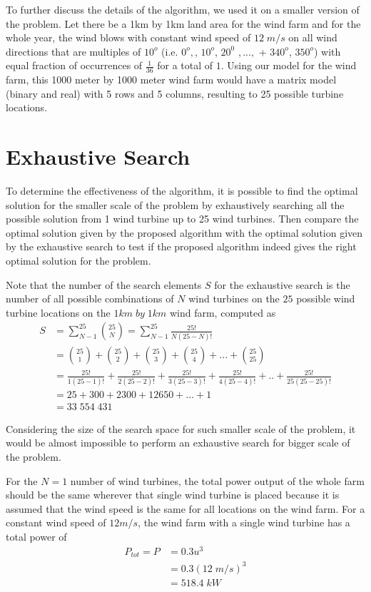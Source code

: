 To further discuss the details of the algorithm, we used it on a smaller version of the problem. Let there be a 1km by 1km land area for the wind farm and for the whole year, the wind blows with constant wind speed of $12\;m/s$ on all wind directions that are multiples of $10^o$ (i.e. $0^o,$, $10^o$, $20^0$ $,...,$ + $340^o$, $350^o$) with equal fraction of occurrences of $\frac{1}{36}$ for a total of $1$. Using our model for the wind farm, this 1000 meter by 1000 meter wind farm would have a matrix model (binary and real) with 5 rows and 5 columns, resulting to 25 possible turbine locations.

    
 \section{Exhaustive Search}
    To determine the effectiveness of the algorithm, it is possible to find the optimal solution for the smaller scale of the problem by exhaustively searching all the possible solution from 1 wind turbine up to 25 wind turbines. Then compare the optimal solution given by the proposed algorithm with the optimal solution given by the exhaustive search to test if the proposed algorithm indeed gives the right optimal solution for the problem.
    
    Note that the number of the search elements $S$ for the exhaustive search is the number of all possible combinations of $N$ wind turbines on the $25$ possible wind turbine locations on the $1km\;by\;1km$ wind farm, computed as
    \begin{align*}
        S
        &= \sum_{N-1}^{25}\binom{25}{N} = \sum_{N-1}^{25}\frac{25!}{N(25-N)!} \\
        &= \binom{25}{1} + \binom{25}{2} + \binom{25}{3} + \binom{25}{4} +...+ \binom{25}{25} \\
        &= \frac{25!}{1(25-1)!} + \frac{25!}{2(25-2)!} + \frac{25!}{3(25-3)!} + \frac{25!}{4(25-4)!} +..+ \frac{25!}{25(25-25)!} \\
        &= 25+300+2300+12650+...+1 \\
        &= 33\;554\;431
    \end{align*}
    
    Considering the size of the search space for such smaller scale of the problem, it would be almost impossible to perform an exhaustive search for bigger scale of the problem.
    
    For the $N=1$ number of wind turbines, the total power output of the whole farm should be the same wherever that single wind turbine is placed because it is assumed that the wind speed is the same for all locations on the wind farm. For a constant wind speed of $12m/s$, the wind farm with a single wind turbine has a total power of
        \begin{align*}
            P_{tot}=P
            &= 0.3u^3 \\
            &= 0.3(12\;m/s)^3\\
            &= 518.4 \;kW
        \end{align*}
        
